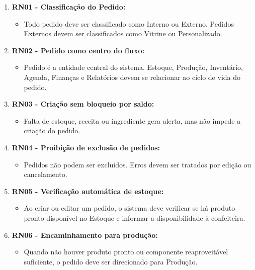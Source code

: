 \begin{enumerate}
    \item \textbf{RN01 - Classificação do Pedido:}
    \begin{itemize}
        \item Todo pedido deve ser classificado como Interno ou Externo. Pedidos Externos devem ser classificados como Vitrine ou Personalizado.
    \end{itemize}

    \item \textbf{RN02 - Pedido como centro do fluxo:}
    \begin{itemize}
        \item Pedido é a entidade central do sistema. Estoque, Produção, Inventário, Agenda, Finanças e Relatórios devem se relacionar ao ciclo de vida do pedido. 
    \end{itemize}

    \item \textbf{RN03 - Criação sem bloqueio por saldo:}
    \begin{itemize}
        \item Falta de estoque, receita ou ingrediente gera alerta, mas não impede a criação do pedido. 
    \end{itemize}

    \item \textbf{RN04 - Proibição de exclusão de pedidos:}
    \begin{itemize}
        \item Pedidos não podem ser excluídos. Erros devem ser tratados por edição ou cancelamento. 
    \end{itemize}

    \item \textbf{RN05 - Verificação automática de estoque:}
    \begin{itemize}
        \item Ao criar ou editar um pedido, o sistema deve verificar se há produto pronto disponível no Estoque e informar a disponibilidade à confeiteira. 
    \end{itemize}

    \item \textbf{RN06 -  Encaminhamento para produção:}
    \begin{itemize}
        \item Quando não houver produto pronto ou componente reaproveitável suficiente, o pedido deve ser direcionado para Produção.
    \end{itemize}


\end{enumerate}
